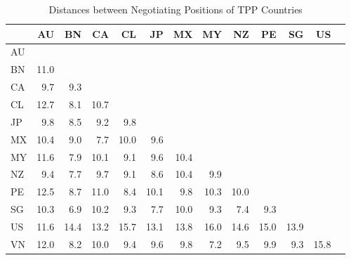 \documentclass[12pt]{article}
\begin{document}
\begin{table}[ht]
\centering
\caption{Distances between Negotiating Positions of TPP Countries}
\label{tbl_tpp_dist}
\begin{tabular}{lrrrrrrrrrrrr}
  \hline
 & AU & BN & CA & CL & JP & MX & MY & NZ & PE & SG & US \\ 
  \hline
AU &  &  &  &  &  &  &  &  &  &  &  \\ 
  BN & 11.0 &  &  &  &  &  &  &  &  &  &  \\ 
  CA & 9.7 & 9.3 &  &  &  &  &  &  &  &  &  \\ 
  CL & 12.7 & 8.1 & 10.7 &  &  &  &  &  &  &  &  \\ 
  JP & 9.8 & 8.5 & 9.2 & 9.8 &  &  &  &  &  &  &  \\ 
  MX & 10.4 & 9.0 & 7.7 & 10.0 & 9.6 &  &  &  &  &  &  \\ 
  MY & 11.6 & 7.9 & 10.1 & 9.1 & 9.6 & 10.4 &  &  &  &  &  \\ 
  NZ & 9.4 & 7.7 & 9.7 & 9.1 & 8.6 & 10.4 & 9.9 &  &  &  &  \\ 
  PE & 12.5 & 8.7 & 11.0 & 8.4 & 10.1 & 9.8 & 10.3 & 10.0 &  &  &  \\ 
  SG & 10.3 & 6.9 & 10.2 & 9.3 & 7.7 & 10.0 & 9.3 & 7.4 & 9.3 &  &  \\ 
  US & 11.6 & 14.4 & 13.2 & 15.7 & 13.1 & 13.8 & 16.0 & 14.6 & 15.0 & 13.9 &  \\ 
  VN & 12.0 & 8.2 & 10.0 & 9.4 & 9.6 & 9.8 & 7.2 & 9.5 & 9.9 & 9.3 & 15.8 \\ 
\hline
\end{tabular}
\end{table}

% 
\end{document}
